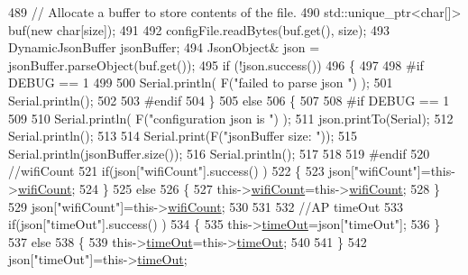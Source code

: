\begin{DoxyCode}
489         \textcolor{comment}{// Allocate a buffer to store contents of the file.}
490         std::unique\_ptr<char[]> buf(\textcolor{keyword}{new} \textcolor{keywordtype}{char}[size]);
491 
492         configFile.readBytes(buf.get(), size);
493         DynamicJsonBuffer jsonBuffer;
494         JsonObject& json = jsonBuffer.parseObject(buf.get());
495         \textcolor{keywordflow}{if} (!json.success()) 
496         \{
497         
498 \textcolor{preprocessor}{        #if DEBUG == 1 }
499 
500             Serial.println( F(\textcolor{stringliteral}{"failed to parse json "}) );
501             Serial.println();
502         
503 \textcolor{preprocessor}{        #endif}
504         \} 
505         \textcolor{keywordflow}{else}
506         \{
507         
508 \textcolor{preprocessor}{        #if DEBUG == 1 }
509         
510             Serial.println( F(\textcolor{stringliteral}{"configuration json is "}) );
511             json.printTo(Serial);
512             Serial.println();
513 
514             Serial.print(F(\textcolor{stringliteral}{"jsonBuffer size: "}));
515             Serial.println(jsonBuffer.size());
516             Serial.println();
517 
518 
519 \textcolor{preprocessor}{        #endif}
520             \textcolor{comment}{//wifiCount}
521             \textcolor{keywordflow}{if}(json[\textcolor{stringliteral}{"wifiCount"}].success() )
522             \{           
523                 json[\textcolor{stringliteral}{"wifiCount"}]=this->\hyperlink{classCoolWifi_ab133bd92fcb895b884deecd6678592e4}{wifiCount};
524             \}
525             \textcolor{keywordflow}{else}
526             \{
527                 this->\hyperlink{classCoolWifi_ab133bd92fcb895b884deecd6678592e4}{wifiCount}=this->\hyperlink{classCoolWifi_ab133bd92fcb895b884deecd6678592e4}{wifiCount};
528             \}
529             json[\textcolor{stringliteral}{"wifiCount"}]=this->\hyperlink{classCoolWifi_ab133bd92fcb895b884deecd6678592e4}{wifiCount};
530 
531             
532             \textcolor{comment}{//AP timeOut}
533             \textcolor{keywordflow}{if}(json[\textcolor{stringliteral}{"timeOut"}].success() )
534             \{
535                 this->\hyperlink{classCoolWifi_a952111605f25156588b5632caaba1c6f}{timeOut}=json[\textcolor{stringliteral}{"timeOut"}];
536             \}
537             \textcolor{keywordflow}{else}
538             \{
539                 this->\hyperlink{classCoolWifi_a952111605f25156588b5632caaba1c6f}{timeOut}=this->\hyperlink{classCoolWifi_a952111605f25156588b5632caaba1c6f}{timeOut};
540 
541             \}
542             json[\textcolor{stringliteral}{"timeOut"}]=this->\hyperlink{classCoolWifi_a952111605f25156588b5632caaba1c6f}{timeOut};

\end{DoxyCode}
